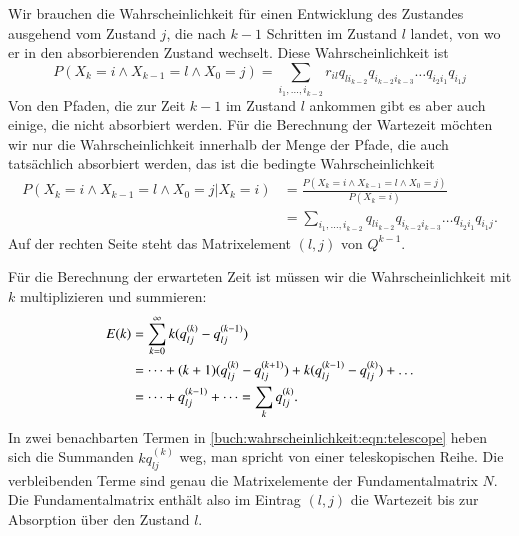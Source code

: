 Wir brauchen die Wahrscheinlichkeit für einen Entwicklung des Zustandes
ausgehend vom Zustand $j$, die nach $k-1$ Schritten im Zustand $l$
landet, von wo er in den absorbierenden Zustand wechselt.
Diese Wahrscheinlichkeit ist
\[
P(X_k = i\wedge X_{k-1} = l \wedge X_0=j)
=
\sum_{i_1,\dots,i_{k-2}}
r_{il} q_{li_{k-2}} q_{i_{k-2}i_{k-3}}\dots q_{i_2i_1} q_{i_1j}
\]
Von den Pfaden, die zur Zeit $k-1$ im Zustand $l$ ankommen gibt es
aber auch einige, die nicht absorbiert werden.
Für die Berechnung der Wartezeit möchten wir nur die Wahrscheinlichkeit
innerhalb der Menge der Pfade, die auch tatsächlich absorbiert werden,
das ist die bedingte Wahrscheinlichkeit
\begin{equation}
\begin{aligned}
P(X_k = i\wedge X_{k-1} = l \wedge X_0=j|X_k=i)
&=
\frac{
P(X_k = i\wedge X_{k-1} = l \wedge X_0=j)
}{
P(X_k=i)
}
\\
&=
\sum_{i_1,\dots,i_{k-2}}
q_{li_{k-2}} q_{i_{k-2}i_{k-3}}\dots q_{i_2i_1} q_{i_1j}.
\end{aligned}
\label{buch:wahrscheinlichkeit:eqn:ankunftswahrscheinlichkeit}
\end{equation}
Auf der rechten Seite steht das Matrixelement $(l,j)$ von $Q^{k-1}$.


Für die Berechnung der erwarteten Zeit ist müssen wir die
Wahrscheinlichkeit mit $k$ multiplizieren und summieren:
\begin{align}
E(k)
&=
\sum_{k=0}^\infty
k(
q^{(k)}_{lj} 
-
q^{(k-1)}_{lj} 
)
\notag
\\
&=
\dots
+
(k+1)(
q^{(k)}_{lj} 
-
q^{(k+1)}_{lj} 
)
+
k(
q^{(k-1)}_{lj} 
-
q^{(k)}_{lj} 
)
+
\dots
\label{buch:wahrscheinlichkeit:eqn:telescope}
\\
&=
\dots
+
q^{(k-1)}_{lj}
+
\dots
=
\sum_{k} q^{(k)}_{lj}.
\notag
\end{align}
In zwei benachbarten Termen in 
\eqref{buch:wahrscheinlichkeit:eqn:telescope}
heben sich die Summanden $kq^{(k)}_{lj}$ weg, man spricht von
einer teleskopischen Reihe.
Die verbleibenden Terme sind genau die Matrixelemente der Fundamentalmatrix $N$.
Die Fundamentalmatrix enthält also im Eintrag $(l,j)$ die Wartezeit
bis zur Absorption über den Zustand $l$.

